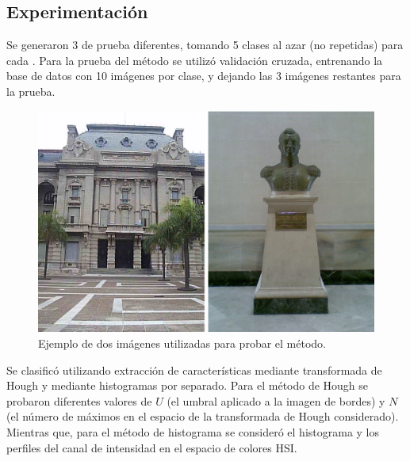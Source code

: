 \documentclass[conference,a4paper,10pt,oneside,final]{tfmpd}
\begin{document}
%
%
\subsection{Experimentación}
Se generaron 3  de prueba diferentes, tomando
5 clases al azar (no repetidas) para cada .
Para la prueba del método 
se utilizó validación cruzada,
entrenando la base de datos con 10 imágenes por clase, y dejando las 3
imágenes restantes para la prueba.


\begin{figure}
\begin{center}
\includegraphics[scale=0.25]{../diagramas/dibujo} 
\end{center}
\caption{Ejemplo de dos imágenes utilizadas para probar el método.}
\label{imagenes}
\end{figure}

Se 
clasificó utilizando extracción de características mediante
transformada de Hough y mediante histogramas por separado. Para el método de Hough
se probaron diferentes valores de $U$ (el umbral
aplicado a la imagen de bordes) y $N$ (el número de máximos en el espacio de
la transformada de Hough considerado). Mientras que, 
para el método de histograma se consideró el histograma y los perfiles del canal de
intensidad en el espacio de colores HSI.
\end{document}
